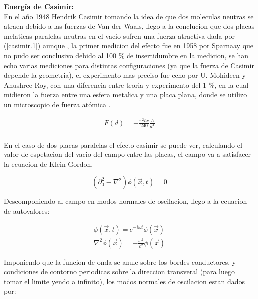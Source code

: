 \textbf{Energía de Casimir:} \\ 

En el año 1948 Hendrik Casimir tomando la idea de que dos moleculas neutras se atraen debido a las fuerzas de Van der Waals, llego a la conclucion que dos placas melaticas paralelas neutras en el vacio sufren una fuerza atractiva dada por (\ref{casimir.1}) aunque , la primer medicion del efecto fue en 1958 por Sparnaay que no pudo ser conclusivo debido al 100 \% de insertidumbre en la medicion, se han echo varias mediciones para distintas configuraciones (ya que la fuerza de Casimir depende la geometria), el experimento mas preciso fue echo por U. Mohideen y Anushree Roy, con una diferencia entre teoria y experimento del 1 \%, en la cual midieron la fuerza entre una esfera metalica y una placa plana, donde se utilizo un microscopio de fuerza atómica \cite{BORDAG20011} .


\begin{equation}
\begin{array}{c}
F(d) = - \frac{\pi ^2 \hbar c}{240} \frac{A}{d^4} \\
\end{array} 
\label{casimir.1}
\end{equation}




En el caso de dos placas paralelas el efecto casimir se puede ver, calculando el valor de espetacion del vacio del campo entre las placas, el campo va a satisfacer la ecuacion de Klein-Gordon.

\begin{equation}
( \partial _0 ^2 - \nabla  ^2  ) \phi (\vec{x} ,t) = 0 
\end{equation}

Descomponiendo al campo en modos normales de oscilacion, llego a la ecuacion de autovalores:

\begin{equation}
\begin{array}{c}
\phi ( \vec{x},t) = e ^{-i \omega t} \phi ( \vec{x}) \\
\nabla ^2 \phi ( \vec{x}) = - \frac{\omega ^2}{c ^2} \phi ( \vec{x})
\end{array}
\end{equation}

Imponiendo que la funcion de onda se anule sobre los bordes conductores, y condiciones de contorno periodicas sobre la direccion transveral (para luego tomar el limite yendo a infinito), los modos normales de oscilacion estan dados por:

